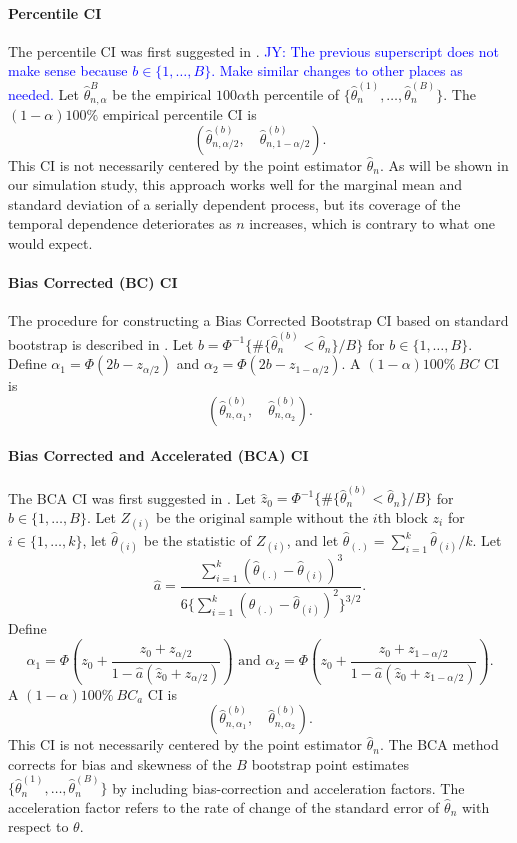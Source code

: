 \documentclass[12pt, letterpaper, titlepage]{article}
\newcommand{\jy}[1]{\textcolor{blue}{JY: #1}}
\begin{document}
\paragraph{Percentile CI}
The percentile CI was first suggested in \citet{efron1979bootstrap}.
\jy{The previous superscript does not make sense because
  $b \in \{1, \ldots,  B\}$. Make similar changes to other places as needed.}
Let $\hat\theta_{n, \alpha}^B$ be the empirical $100\alpha$th percentile of
$\{\hat\theta_n^{(1)}, \ldots, \hat\theta_n^{(B)}\}$. The $(1 - \alpha)100\%$
empirical percentile CI is
\[
(\hat\theta_{n, \alpha/2}^{(b)}, \quad \hat\theta_{n, 1 - \alpha/2}^{(b)}).
\]
This CI is not necessarily centered by the point estimator $\hat\theta_n$. As
will be shown in our simulation study, this approach works well for the
marginal mean and standard deviation of a serially dependent process, but its
coverage of the temporal dependence deteriorates as $n$ increases, which is
contrary to what one would expect.


\paragraph{Bias Corrected (BC) CI}
The procedure for constructing a Bias Corrected Bootstrap CI based on standard
bootstrap is described in \citet{carpenter2000bootstrap}. Let
$b = \Phi^{-1}\{\#\{\hat\theta_n^{(b)} < \hat{\theta}_n\} / B\}$ for
$b \in \{1, \ldots, B\}$. Define $\alpha_1 = \Phi(2b - z_{\alpha/2})$ and 
$\alpha_2 = \Phi(2b - z_{1 - \alpha/2})$. A $(1 - \alpha)100\%~BC$ CI is
\[
(\hat\theta_{n, \alpha_1}^{(b)}, \quad \hat\theta_{n, \alpha_2}^{(b)}).
\]


\paragraph{Bias Corrected and Accelerated (BCA) CI}
The BCA CI was first suggested in \citet{efron1987better}. Let
$\hat{z}_0 = \Phi^{-1}\{\#\{\hat\theta_n^{(b)} < \hat{\theta}_n\} / B\}$ for
$b \in \{1, \ldots, B\}$. Let $Z_{(i)}$ be the original sample without the
$i$th block $z_i$ for $i \in \{1, \ldots, k\}$, let $\hat{\theta}_{(i)}$ be
the statistic of $Z_{(i)}$, and let
$\hat{\theta}_{(.)} = \sum_{i=1}^{k} \hat{\theta}_{(i)} / k$. 
Let 
\[
\hat{a} = \frac{\sum_{i=1}^{k} (\hat{\theta}_{(.)} -
  \hat{\theta}_{(i)})^3}{6\{\sum_{i=1}^{k} (\hat{\theta}_{(.)} -
  \hat{\theta}_{(i)})^2\}^{3/2}}.
\]
Define
\[
\alpha_1 = \Phi\left(z_0 + \frac{z_{0} +
  z_{\alpha/2}}{1 - \hat{a}(\hat{z}_{0} + z_{\alpha/2})}\right)
\text{ and }
\alpha_2 = \Phi\left(z_0 + \frac{z_{0} +
  z_{1 - \alpha/2}}{1 - \hat{a}(\hat{z}_{0} + z_{1 - \alpha/2})}\right).
\]
A $(1 - \alpha)100\%~BC_a$ CI is
\[
(\hat\theta_{n, \alpha_1}^{(b)}, \quad \hat\theta_{n, \alpha_2}^{(b)}).
\]
This CI is not necessarily centered by the point estimator $\hat\theta_n$. The
BCA method corrects for bias and skewness of the $B$ bootstrap point
estimates $\{\hat\theta_n^{(1)}, \ldots, \hat\theta_n^{(B)}\}$ by including
bias-correction and acceleration factors. The acceleration factor refers to
the rate of change of the standard error of $\hat\theta_n$ with respect to
$\theta$.
\end{document}
